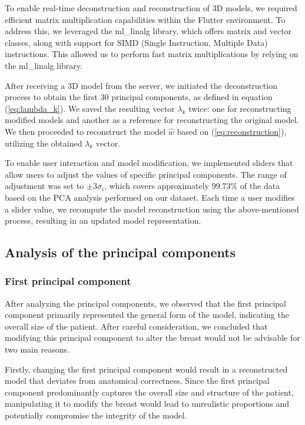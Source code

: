To enable real-time deconstruction and reconstruction of 3D models, we required efficient matrix multiplication capabilities within the Flutter environment. To address this, we leveraged the ml\_linalg library, 
which offers matrix and vector classes, along with support for SIMD (Single Instruction, Multiple Data) instructions. This allowed us to perform fast matrix multiplications by relying on the ml\_linalg library.

After receiving a 3D model from the server, we initiated the deconstruction process to obtain the first 30 principal components, as defined in equation (\ref{eq:lambda_k}). We saved the resulting vector 
$\lambda_k$ twice: one for reconstructing modified models and another as a reference for reconstructing the original model. We then proceeded to reconstruct the model $\hat{w}$ based on 
(\ref{eq:reconstruction}), utilizing the obtained $\lambda_k$ vector.

To enable user interaction and model modification, we implemented sliders that allow users to adjust the values of specific principal components. The range of adjustment was set to $\pm 3\sigma_i$, 
which covers approximately 99.73\% of the data based on the PCA analysis performed on our dataset. Each time a user modifies a slider value, we recompute the model reconstruction using the 
above-mentioned process, resulting in an updated model representation.

\subsection{Analysis of the principal components}

\subsubsection{First principal component}

After analyzing the principal components, we observed that the first principal component primarily represented the general form of the model, indicating the overall size of the patient. 
After careful consideration, we concluded that modifying this principal component to alter the breast would not be advisable for two main reasons.

Firstly, changing the first principal component would result in a reconstructed model that deviates from anatomical correctness. Since the first principal component predominantly captures the 
overall size and structure of the patient, manipulating it to modify the breast would lead to unrealistic proportions and potentially compromise the integrity of the model.

